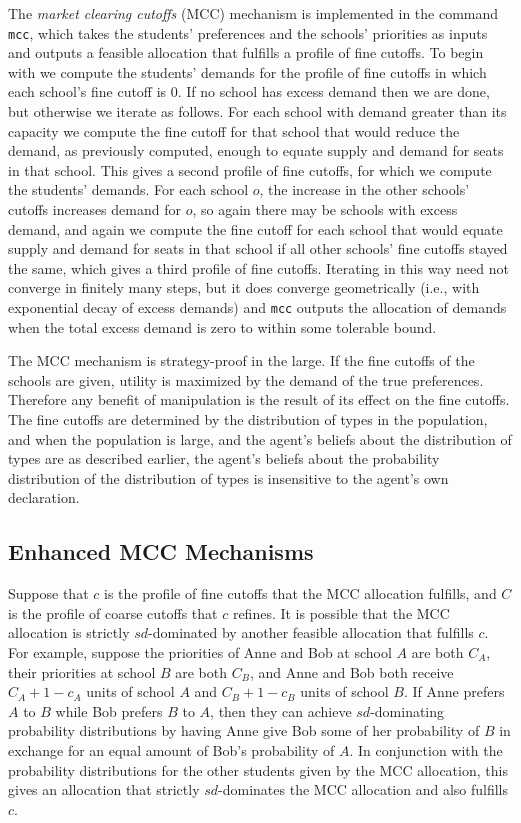 \documentclass[12pt]{article}
\theoremstyle{definition}
\begin{document}
The \emph{market clearing cutoffs} (MCC) mechanism is implemented in
the command \texttt{mcc}, which takes the students' preferences and
the schools' priorities as inputs and outputs a feasible allocation
that fulfills a profile of fine cutoffs.  To begin with we compute the
students' demands for the profile of fine cutoffs in which each
school's fine cutoff is $0$.  If no school has excess demand then we
are done, but otherwise we iterate as follows.  For each school with
demand greater than its capacity we compute the fine cutoff for that
school that would reduce the demand, as previously computed, enough to
equate supply and demand for seats in that school.  This gives a
second profile of fine cutoffs, for which we compute the students'
demands.  For each school $o$, the increase in the other schools'
cutoffs increases demand for $o$, so again there may be schools with
excess demand, and again we compute the fine cutoff for each school
that would equate supply and demand for seats in that school if all
other schools' fine cutoffs stayed the same, which gives a third
profile of fine cutoffs.  Iterating in this way need not converge in
finitely many steps, but it does converge geometrically (i.e., with
exponential decay of excess demands) and \texttt{mcc} outputs the
allocation of demands when the total excess demand is zero to within
some tolerable bound.

The MCC mechanism is strategy-proof in the large.  If the fine cutoffs
of the schools are given, utility is maximized by the demand of the
true preferences.  Therefore any benefit of manipulation is the result
of its effect on the fine cutoffs.  The fine cutoffs are determined by
the distribution of types in the population, and when the population
is large, and the agent's beliefs about the distribution of types are
as described earlier, the agent's beliefs about the probability
distribution of the distribution of types is insensitive to the
agent's own declaration.  

\subsection{Enhanced MCC Mechanisms}

Suppose that $c$ is the profile of fine cutoffs that the MCC
allocation fulfills, and $C$ is the profile of coarse cutoffs that $c$
refines.  It is possible that the MCC allocation is strictly
$sd$-dominated by another feasible allocation that fulfills $c$.  For
example, suppose the priorities of Anne and Bob at school $A$ are both
$C_A$, their priorities at school $B$ are both $C_B$, and Anne
and Bob both receive $C_A + 1 - c_A$ units of school $A$ and $C_B
+ 1 - c_B$ units of school $B$.  If Anne prefers $A$ to $B$ while Bob
prefers $B$ to $A$, then they can achieve $sd$-dominating probability
distributions by having Anne give Bob some of her probability of $B$
in exchange for an equal amount of Bob's probability of $A$.  In
conjunction with the probability distributions for the other students
given by the MCC allocation, this gives an allocation that strictly
$sd$-dominates the MCC allocation and also fulfills $c$.
\end{document}
